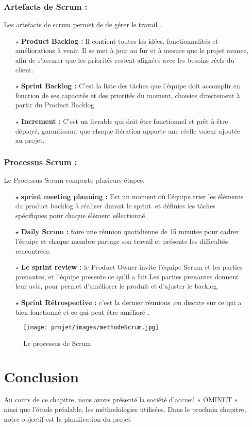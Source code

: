 \subsubsection{ Artefacts de Scrum :}
Les artefacts de scrum permet de  de gérer le travail .
 \begin{itemize}
\item[$\star$] \textbf{Product Backlog : } Il contient toutes les idées, fonctionnalités et améliorations à venir. Il se met à jour au fur et à mesure que le projet avance, afin de s’assurer que les priorités restent alignées avec les besoins réels du client.
\item[$\star$]\textbf{Sprint Backlog : } C’est la liste des tâches que l’équipe doit accomplir en fonction de ses capacités et des priorités du moment, choisies directement à partir du Product Backlog
\item[$\star$]\textbf{ Increment : }C'est un livrable qui doit être fonctionnel et prêt à être déployé, garantissant que chaque itération apporte une réelle valeur ajoutée au projet.
\end{itemize}
\subsubsection{Processus Scrum : }
Le Processus Scrum comporte plusieurs étapes.
 \begin{itemize}
    \item[$\star$] \textbf{ sprint meeting planning : } Est un moment où l'équipe trier les éléments du product backlog à réaliser durant le sprint.
et définies les tâches spécifiques  pour chaque élément sélectionné.
      \item[$\star$] \textbf{ Daily Scrum : }  faire une réunion quotidienne de 15 minutes pour cadrer l'équipe et chaque membre partage son travail et  présente les difficultés rencontrées.
       \item[$\star$] \textbf{Le sprint review : } le Product Owner invite l’équipe Scrum et les parties prenantes, et l’équipe presente ce qu’il  a fait.Les parties prenantes donnent leur avis, pour permet d'améliorer le produit et d’ajuster le backlog.
        \item[$\star$] \textbf{Sprint Rétrospective : } c'est la dernier réunions ,on discute sur ce qui a bien fonctionné et ce qui peut être amélioré .
\end{itemize}
\begin{figure}[H]
    \centering
    \texttt{[image: projet/images/methodeScrum.jpg]}
    \caption{ Le processus de Scrum}
    \label{fig:image_centree}
\end{figure}


\section*{Conclusion}
Au cours de ce chapitre, nous avons présenté la société d’accueil « OMINET » ainsi que l’étude préalable, les méthodologies utilisées.
Dans le prochain chapitre, notre objectif est la planification du projet
